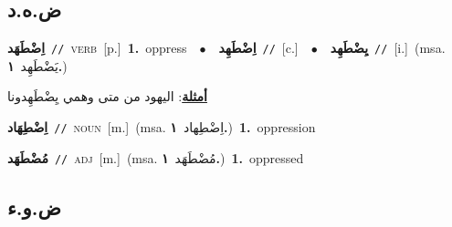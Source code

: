 \documentclass[10pt,a4paper,twoside]{article} %
\begin{document}
\begin{multicols}{2}
\vspace{-3mm}
\subsection*{\color{blue}\foreignlanguage{arabic}{ض.ه.د}\color{blue}{}} 

{\setlength\topsep{0pt}\textbf{\foreignlanguage{arabic}{اِضْطَهَد}}\ {\color{gray}\texttt{//}\color{black}}\ \textsc{verb}\ [p.]\ \textbf{1.}~oppress\ \ $\bullet$\ \ \setlength\topsep{0pt}\textbf{\foreignlanguage{arabic}{اِضْطَهِد}}\ {\color{gray}\texttt{//}\color{black}}\ [c.]\ \ $\bullet$\ \ \setlength\topsep{0pt}\textbf{\foreignlanguage{arabic}{يِضْطَهِد}}\ {\color{gray}\texttt{//}\color{black}}\ [i.]\ \color{gray}(msa. \foreignlanguage{arabic}{يَضْطَهِد}~\foreignlanguage{arabic}{\textbf{١.}})\color{black}\  \begin{flushright}\color{gray}\foreignlanguage{arabic}{\textbf{\underline{\foreignlanguage{arabic}{أمثلة}}}: اليهود من متى وهمي يِضْطَهِدونا}\end{flushright}\color{black}} \vspace{2mm}

{\setlength\topsep{0pt}\textbf{\foreignlanguage{arabic}{اِضْطِهَاد}}\ {\color{gray}\texttt{//}\color{black}}\ \textsc{noun}\ [m.]\ \color{gray}(msa. \foreignlanguage{arabic}{اِضْطِهاد}~\foreignlanguage{arabic}{\textbf{١.}})\color{black}\ \textbf{1.}~oppression\ } \vspace{2mm}

{\setlength\topsep{0pt}\textbf{\foreignlanguage{arabic}{مُضْطَهَد}}\ {\color{gray}\texttt{//}\color{black}}\ \textsc{adj}\ [m.]\ \color{gray}(msa. \foreignlanguage{arabic}{مُضْطَهَد}~\foreignlanguage{arabic}{\textbf{١.}})\color{black}\ \textbf{1.}~oppressed\ } \vspace{2mm}

\vspace{-3mm}
\subsection*{\color{blue}\foreignlanguage{arabic}{ض.و.ء}\color{blue}{}} 


\end{multicols}
\end{document}
